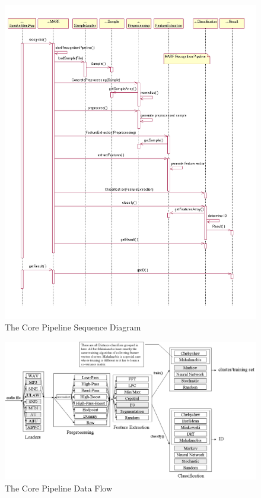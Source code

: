 \begin{figure}
	\centering
	\includegraphics[angle=90,totalheight=660pt,width=550pt]{../graphics/arch/pipeline.png}
	\caption{The Core Pipeline Sequence Diagram}
	\label{fig:pipeline}
\end{figure}

\begin{figure}
	\centering
	\includegraphics[width=\textwidth]{../graphics/arch/pipeline-flow.png}
	\caption{The Core Pipeline Data Flow}
	\label{fig:pipeline-flow}
\end{figure}

